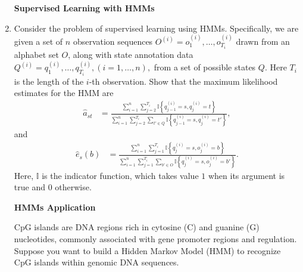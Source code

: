 \begin{enumerate}
\begin{solution}
\end{solution}

\clearpage

\textbf{Supervised Learning with HMMs}

\item  Consider the problem of supervised learning using HMMs. Specifically, we are given a set of $n$ observation sequences $O^{(i)} = o_1^{(i)}, \dots, o_{T_i}^{(i)}$ drawn from an alphabet set $O$, along with state annotation data $Q^{(i)} = q_1^{(i)}, \dots, q_{T_i}^{(i)}, (i=1, \dots, n),$ from a set of possible states $Q$. Here $T_i$ is the length of the $i$-th observation. Show that the maximum likelihood estimates for the HMM are 
\begin{align*} 
\hat{a}_{st} &= \frac{\sum_{i=1}^n \sum_{j=2}^{T_i} \mathbb{I} \left \{ q_{j-1}^{(i)} = s, q_j^{(i)} = t \right \} }{\sum_{i=1}^n \sum_{j=2}^{T_i} \sum_{t' \in Q} \mathbb{I} \left \{ q_{j-1}^{(i)} = s, q_j^{(i)} = t' \right \}},
\end{align*}
and 
\begin{align*}
\hat{e}_{s}(b) &= \frac{\sum_{i=1}^n \sum_{j=1}^{T_i} \mathbb{I} \left \{ q_{j}^{(i)} = s, o_j^{(i)} = b \right \} }{\sum_{i=1}^n \sum_{j=1}^{T_i} \sum_{b' \in O} \mathbb{I} \left \{ q_{j}^{(i)} = s, o_j^{(i)} = b' \right \}}.
\end{align*}
Here, $\mathbb I$ is the indicator function, which takes value $1$ when its argument is true and $0$ otherwise. 

\begin{solution}

\end{solution}

\vspace{10pt}
 

\textbf{HMMs Application}



CpG islands are DNA regions rich in cytosine (C) and guanine (G) nucleotides, commonly associated with gene promoter regions and regulation. Suppose you want to build a Hidden Markov Model (HMM) to recognize CpG islands within genomic DNA sequences.


\end{enumerate}
